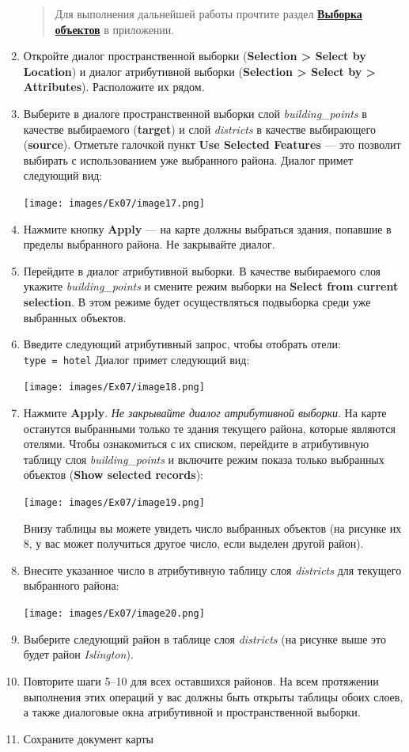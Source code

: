 \documentclass[12pt,]{book}
\begin{document}
\begin{enumerate}
  \begin{quote}
  Для выполнения дальнейшей работы прочтите раздел \textbf{\protect\hyperlink{manual-select}{Выборка объектов}} в приложении.
  \end{quote}
\item
  Откройте диалог пространственной выборки (\textbf{Selection \textgreater{} Select by Location}) и диалог атрибутивной выборки (\textbf{Selection \textgreater{} Select by \textgreater{} Attributes}). Расположите их рядом.
\item
  Выберите в диалоге пространственной выборки слой \emph{building\_points} в качестве выбираемого (\textbf{target}) и слой \emph{districts} в качестве выбирающего (\textbf{source}). Отметьте галочкой пункт \textbf{Use Selected Features} --- это позволит выбирать с использованием уже выбранного района. Диалог примет следующий вид:

  \texttt{[image: images/Ex07/image17.png]}
\item
  Нажмите кнопку \textbf{Apply} --- на карте должны выбраться здания, попавшие в пределы выбранного района. Не закрывайте диалог.
\item
  Перейдите в диалог атрибутивной выборки. В качестве выбираемого слоя укажите \emph{building\_points} и смените режим выборки на \textbf{Select from current selection}. В этом режиме будет осуществляться подвыборка среди уже выбранных объектов.
\item
  Введите следующий атрибутивный запрос, чтобы отобрать отели:
  \texttt{type\ =\ \textquotesingle{}hotel\textquotesingle{}}
  Диалог примет следующий вид:

  \texttt{[image: images/Ex07/image18.png]}
\item
  Нажмите \textbf{Apply}. \emph{Не закрывайте диалог атрибутивной выборки}. На карте останутся выбранными только те здания текущего района, которые являются отелями. Чтобы ознакомиться с их списком, перейдите в атрибутивную таблицу слоя \emph{building\_points} и включите режим показа только выбранных объектов (\textbf{Show selected records}):

  \texttt{[image: images/Ex07/image19.png]}

  Внизу таблицы вы можете увидеть число выбранных объектов (на рисунке их 8, у вас может получиться другое число, если выделен другой район).
\item
  Внесите указанное число в атрибутивную таблицу слоя \emph{districts} для текущего выбранного района:

  \texttt{[image: images/Ex07/image20.png]}
\item
  Выберите следующий район в таблице слоя \emph{districts} (на рисунке выше это будет район \emph{Islington}).
\item
  Повторите шаги 5--10 для всех оставшихся районов. На всем протяжении выполнения этих операций у вас должны быть открыты таблицы обоих слоев, а также диалоговые окна атрибутивной и пространственной выборки.
\item
  Сохраните документ карты
\end{enumerate}
\end{document}
